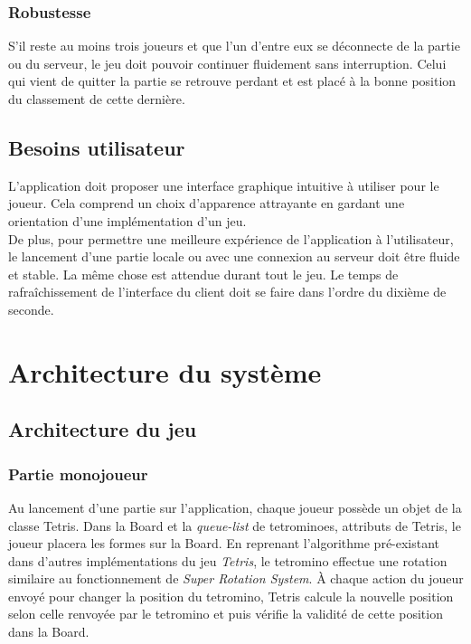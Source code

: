 \documentclass{article}
\begin{document}
\subsubsection{Robustesse}

S'il reste au moins trois joueurs et que l'un d'entre eux se déconnecte de la partie ou du serveur, le jeu doit pouvoir continuer fluidement sans interruption. Celui qui vient de quitter la partie se retrouve perdant et est placé à la bonne position du classement de cette dernière.

\subsection{Besoins utilisateur}

L'application doit proposer une interface graphique intuitive à utiliser pour le joueur. Cela comprend un choix d'apparence attrayante en gardant une orientation d'une implémentation d'un jeu.\\
 De plus, pour permettre une meilleure expérience de l'application à l'utilisateur, le lancement d'une partie locale ou avec une connexion au serveur doit être fluide et stable. La même chose est attendue durant tout le jeu. Le temps de rafraîchissement de l'interface du client doit se faire dans l'ordre du dixième de seconde.

\newpage

\section{Architecture du système}

\subsection{Architecture du jeu}

\subsubsection{Partie monojoueur}

Au lancement d'une partie sur l'application, chaque joueur possède un objet de la classe Tetris. Dans la Board et la \textit{queue-list} de tetrominoes, attributs de Tetris, le joueur placera les formes sur la Board. En reprenant l'algorithme pré-existant dans d'autres implémentations du jeu \textit{Tetris}, le tetromino effectue une rotation similaire au fonctionnement de \textit{Super Rotation System}. À chaque action du joueur envoyé pour changer la position du tetromino, Tetris calcule la nouvelle position selon celle renvoyée par le tetromino et puis vérifie la validité de cette position dans la Board. 
\end{document}
